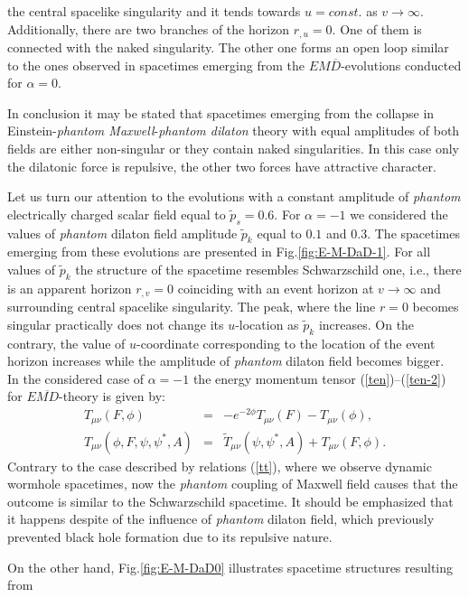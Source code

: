 \documentclass[aps,showpacs,nofootinbib,floatfix]{revtex4}
\newcommand{\ben}{\begin{eqnarray}}
\newcommand{\een}{\end{eqnarray}}
\newcommand{\tpe}{{\tilde p}}
\newcommand{\tT}{\tilde T}
\newcommand{\zpsi}{\psi^{\ast}}
\begin{document}
the central spacelike singularity and it tends towards $u=const.$ as $v\rightarrow\infty$.
Additionally, there are two branches of the horizon $r_{,u}=0$. One of them is connected 
with the naked singularity. The other one forms an open loop similar to the ones observed 
in spacetimes emerging from the $EM\overline{D}$-evolutions conducted for $\alpha=0$.
\par
In conclusion it may be stated that spacetimes emerging from the collapse 
in Einstein-{\it phantom Maxwell}-{\it phantom dilaton} theory with equal amplitudes of both fields 
are either non-singular or they contain naked singularities. In this case 
only the dilatonic force is repulsive, the other two forces have attractive character.
\par
Let us turn our attention to
the evolutions with a constant amplitude of {\it phantom} electrically charged scalar field equal to $\tpe_s=0.6$. 
For $\alpha=-1$ we considered the values of {\it phantom} dilaton field amplitude $\tpe_k$ equal to $0.1$ and $0.3$. 
The spacetimes emerging from these evolutions are presented in Fig.\ref{fig:E-M-DaD-1}. For all values of $\tpe_k$ the structure of the spacetime resembles Schwarzschild one, i.e., there is an apparent horizon $r_{,v}=0$ coinciding 
with an event horizon at $v\rightarrow\infty$ and surrounding central spacelike singularity. 
The peak, where the line $r=0$ becomes singular practically does not change its $u$-location as $\tpe_k$ increases. On the contrary, the value 
of $u$-coordinate corresponding to the location of the event horizon 
increases while the amplitude of {\it phantom} dilaton field becomes bigger.\\
In the considered case of $\alpha = -1$ the energy momentum tensor (\ref{ten})--(\ref{ten-2}) for $E\overline{MD}$-theory is given by:
\ben \label{taa0}
T_{\mu \nu}(F, \phi) &=& - e^{- 2 \phi} T_{\mu \nu}(F) - T_{\mu \nu}(\phi), \\ \nonumber
T_{\mu \nu}(\phi, F, \psi, \zpsi, A) &=& \tT_{\mu \nu}(\psi, \zpsi, A) + T_{\mu \nu}(F, \phi).
\een
Contrary to the case described by relations (\ref{tt}), where we observe dynamic wormhole spacetimes, now
the {\it phantom} coupling of Maxwell field causes that the outcome is similar to the Schwarzschild
spacetime. It should be emphasized that it happens despite of the influence of {\it phantom} 
dilaton field, which previously prevented black hole formation due to its repulsive nature.
\par
On the other hand, Fig.\ref{fig:E-M-DaD0} illustrates spacetime structures resulting from 
\end{document}
